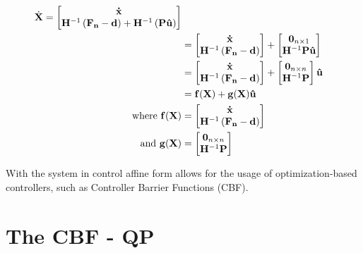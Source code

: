     \begin{align*}
    \dot{\mathbf{X}} =
    \begin{bmatrix}
     {\mathbf{\dot{x}}} \\ {\mathbf{H}} ^{-1}\left ({\mathbf{F_n}}  - {\mathbf{d}} \right ) + {\mathbf{H}} ^{-1}\left ( \mathbf{P}\mathbf{\hat{u}} \right )
    \end{bmatrix} \\ &=
    \begin{bmatrix}
     {\mathbf{\dot{x}}} \\ {\mathbf{H}} ^{-1}\left ({\mathbf{F_n}}  - {\mathbf{d}} \right )
    \end{bmatrix} + \begin{bmatrix}
     {\mathbf{0}}_{n \times 1} \\  {\mathbf{H}} ^{-1} \mathbf{P}\mathbf{\hat{u}}
    \end{bmatrix} \\
    &=
    \begin{bmatrix}
     {\mathbf{\dot{x}}} \\ {\mathbf{H}} ^{-1}\left ({\mathbf{F_n}}  - {\mathbf{d}} \right )
    \end{bmatrix} + \begin{bmatrix}
     {\mathbf{0}}_{n \times n} \\  {\mathbf{H}} ^{-1}\mathbf{P}
    \end{bmatrix}\mathbf{\hat{u}} \\
    &= \mathbf{f}(\mathbf{X}) + \mathbf{g}(\mathbf{X})\mathbf{\hat{u}} \\
    \text{where } \mathbf{f}(\mathbf{X}) &= \begin{bmatrix}
     {\mathbf{\dot{x}}} \\ {\mathbf{H}} ^{-1}\left ({\mathbf{F_n}}  - {\mathbf{d}} \right )
    \end{bmatrix} \\ \text{ and } \mathbf{g}(\mathbf{X}) &= \begin{bmatrix}
     {\mathbf{0}}_{n \times n} \\  {\mathbf{H}} ^{-1}\mathbf{P}
    \end{bmatrix}
\end{align*}


\noindent With the system in control affine form allows for the usage of optimization-based controllers, such as Controller Barrier Functions (CBF).

\section{The CBF  - QP}

